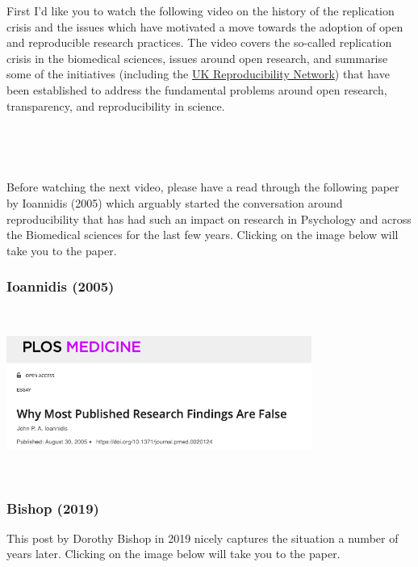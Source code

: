 \documentclass[
]{book}
\begin{document}
First I'd like you to watch the following video on the history of the replication crisis and the issues which have motivated a move towards the adoption of open and reproducible research practices. The video covers the so-called replication crisis in the biomedical sciences, issues around open research, and summarise some of the initiatives (including the \href{https://www.bristol.ac.uk/psychology/research/ukrn/}{UK Reproducibility Network}) that have been established to address the fundamental problems around open research, transparency, and reproducibility in science.

~~

~~

Before watching the next video, please have a read through the following paper by Ioannidis (2005) which arguably started the conversation around reproducibility that has had such an impact on research in Psychology and across the Biomedical sciences for the last few years. Clicking on the image below will take you to the paper.

\hypertarget{ioannidis-2005}{%
\subsubsection*{Ioannidis (2005)}\label{ioannidis-2005}}

~~

\href{https://journals.plos.org/plosmedicine/article?id=10.1371/journal.pmed.0020124}{\includegraphics[width=0.75\textwidth,height=\textheight]{images/ionnidis.png}}

~~

\hypertarget{bishop-2019}{%
\subsubsection*{Bishop (2019)}\label{bishop-2019}}

This post by Dorothy Bishop in 2019 nicely captures the situation a number of years later. Clicking on the image below will take you to the paper.
\end{document}
